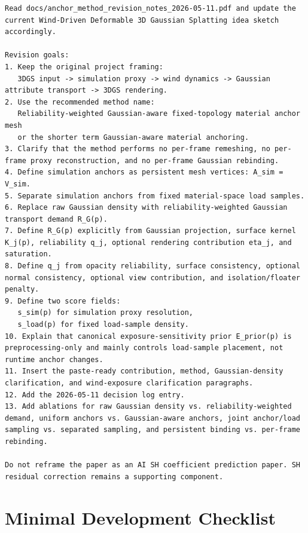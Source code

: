 \documentclass[11pt,a4paper]{article}
\begin{document}
\begin{lstlisting}
Read docs/anchor_method_revision_notes_2026-05-11.pdf and update the current Wind-Driven Deformable 3D Gaussian Splatting idea sketch accordingly.

Revision goals:
1. Keep the original project framing:
   3DGS input -> simulation proxy -> wind dynamics -> Gaussian attribute transport -> 3DGS rendering.
2. Use the recommended method name:
   Reliability-weighted Gaussian-aware fixed-topology material anchor mesh
   or the shorter term Gaussian-aware material anchoring.
3. Clarify that the method performs no per-frame remeshing, no per-frame proxy reconstruction, and no per-frame Gaussian rebinding.
4. Define simulation anchors as persistent mesh vertices: A_sim = V_sim.
5. Separate simulation anchors from fixed material-space load samples.
6. Replace raw Gaussian density with reliability-weighted Gaussian transport demand R_G(p).
7. Define R_G(p) explicitly from Gaussian projection, surface kernel K_j(p), reliability q_j, optional rendering contribution eta_j, and saturation.
8. Define q_j from opacity reliability, surface consistency, optional normal consistency, optional view contribution, and isolation/floater penalty.
9. Define two score fields:
   s_sim(p) for simulation proxy resolution,
   s_load(p) for fixed load-sample density.
10. Explain that canonical exposure-sensitivity prior E_prior(p) is preprocessing-only and mainly controls load-sample placement, not runtime anchor changes.
11. Insert the paste-ready contribution, method, Gaussian-density clarification, and wind-exposure clarification paragraphs.
12. Add the 2026-05-11 decision log entry.
13. Add ablations for raw Gaussian density vs. reliability-weighted demand, uniform anchors vs. Gaussian-aware anchors, joint anchor/load sampling vs. separated sampling, and persistent binding vs. per-frame rebinding.

Do not reframe the paper as an AI SH coefficient prediction paper. SH residual correction remains a supporting component.
\end{lstlisting}

\section{Minimal Development Checklist}
\end{document}
